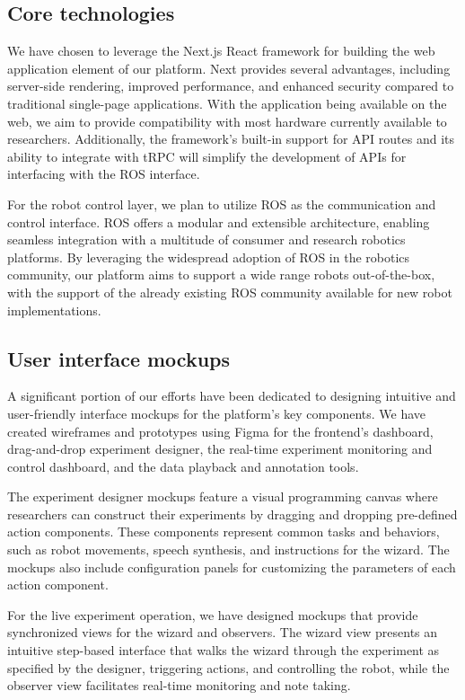 \documentclass[letterpaper, 10 pt, conference]{ieeeconf}
\begin{document}
\subsection{Core technologies}

We have chosen to leverage the Next.js React framework for building the web application element of our platform. Next provides several advantages, including server-side rendering, improved performance, and enhanced security compared to traditional single-page applications. With the application being available on the web, we aim to provide compatibility with most hardware currently available to researchers. Additionally, the framework's built-in support for API routes and its ability to integrate with tRPC will simplify the development of APIs for interfacing with the ROS interface.

For the robot control layer, we plan to utilize ROS as the communication and control interface. ROS offers a modular and extensible architecture, enabling seamless integration with a multitude of consumer and research robotics platforms. By leveraging the widespread adoption of ROS in the robotics community, our platform aims to support a wide range robots out-of-the-box, with the support of the already existing ROS community available for new robot implementations.

\subsection{User interface mockups}

A significant portion of our efforts have been dedicated to designing intuitive and user-friendly interface mockups for the platform's key components. We have created wireframes and prototypes using Figma for the frontend's dashboard, drag-and-drop experiment designer, the real-time experiment monitoring and control dashboard, and the data playback and annotation tools.

The experiment designer mockups feature a visual programming canvas where researchers can construct their experiments by dragging and dropping pre-defined action components. These components represent common tasks and behaviors, such as robot movements, speech synthesis, and instructions for the wizard. The mockups also include configuration panels for customizing the parameters of each action component.

For the live experiment operation, we have designed mockups that provide synchronized views for the wizard and observers. The wizard view presents an intuitive step-based interface that walks the wizard through the experiment as specified by the designer, triggering actions, and controlling the robot, while the observer view facilitates real-time monitoring and note taking.
\end{document}
